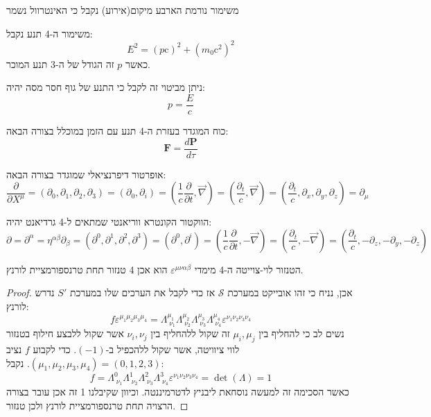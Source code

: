 \documentclass{tstextbook}
\begin{document}
\begin{corollary}
משימור נורמת הארבע מיקום(אירוע) נקבל כי האינטרוול נשמר

\end{corollary}
\begin{corollary}
משימור ה-4 תנע נקבל:
$$E^{2}=(p\mathrm{c})^{2}+\left(m_{0}\mathrm{c}^{2}\right)^{2}$$
כאשר \(p\) זה הגודל של ה-3 תנע המוכר.

\end{corollary}
\begin{corollary}
ניתן מביטוי זה לקבל כי התנע של גוף חסר מסה יהיה:
$$p=\frac{E}{c}$$

\end{corollary}
\begin{definition}[4 כוח]
כוח המוגדר בעזרת ה-4 תנע עם הזמן במוכלל בצורה הבאה:
$$\mathbf{F}={\frac{d\mathbf{P}}{d\tau}}$$

\end{definition}
\begin{definition}[4 גרדיאנט]
אופרטור דיפרנציאלי שמוגדר בצורה הבאה:
$${\frac{\partial}{\partial X^{\mu}}}=(\partial_{0},\partial_{1},\partial_{2},\partial_{3})=(\partial_{0},\partial_{i})=\left({\frac{1}{c}}{\frac{\partial}{\partial t}},{\vec{\nabla}}\right)=\left({\frac{\partial_{t}}{c}},{\vec{\nabla}}\right)=\left({\frac{\partial_{t}}{c}},\partial_{x},\partial_{y},\partial_{z}\right)=\partial_{\mu}$$

\end{definition}
\begin{proposition}
הווקטור הקונטרא ווריאנטי שמתאים ל-4 גרדיאנט יהיה:
$$\partial=\partial^{\alpha}=\eta^{\alpha\beta}\partial_{\beta}=\left(\partial^{0},\partial^{1},\partial^{2},\partial^{3}\right)=\left(\partial^{0},\partial^{i}\right)=\left(\frac{1}{c}\frac{\partial}{\partial t},-\vec{\nabla}\right)=\left(\frac{\partial_{t}}{c},-\vec{\nabla}\right)=\left(\frac{\partial_{t}}{c},-\partial_{z},-\partial_{y},-\partial_{z}\right)$$

\end{proposition}
\begin{proposition}
הטנזור לוי-צוייטה ה-4 מימדי \(\varepsilon^{\mu \nu \alpha \beta}\) הוא אכן 4 טנזור תחת טרנספורמציית לורנץ.

\end{proposition}
\begin{proof}
אכן, נניח כי זהו אובייקט במערכת \(\mathcal{S}\) אז כדי לקבל את הערכים שלו במערכת \(S'\) נדרש לורנץ:
$$f\varepsilon^{\mu_{1}\mu_{2}\mu_{3}\mu_{4}}=\Lambda^{\mu_{1}}_{\;\nu_{1}}\Lambda^{\mu_{2}}_{\;\nu_{2}}\Lambda^{\mu_{3}}_{\;\nu_{3}}\Lambda^{\mu_{4}}_{\; \nu_{4}}\varepsilon^{\nu_{1}\nu_{2}\nu_{3}\nu_{4}}$$
נשים לב כי להחליף בין \(\mu_{i},\mu_{j}\) זה שקול ללהחליף בין \(\nu_{i},\nu_{j}\) אשר שקול ללבצע חילוף בטנזור לווי ציוויטה, אשר שקול ללהכפיל ב-\((-1)\). 
כדי לקבוע \(f\) נציב \(\left( \mu_{1},\mu_{2},\mu_{3},\mu_{4} \right)=(0,1,2,3)\). נקבל:
$$f=\Lambda^0_{\;\nu_{1}}\Lambda^1_{\;\nu_{2}} \Lambda^2_{\;\nu_{3}}\Lambda^3_{\;\nu_{4}}\varepsilon^{\nu_{1}\nu_{2}\nu_{3}\nu_{4}}=\det\left( \Lambda\right)=1$$
כאשר הסכימה זה למעשה נוסחאת ליבניץ לדטרמיננטה. וכיוון שקיבלנו 1 זה אכן עובר בצורה הרצויה תחת טרנספורמציית לורנץ ולכן טנזור.

\end{proof}
\end{document}
